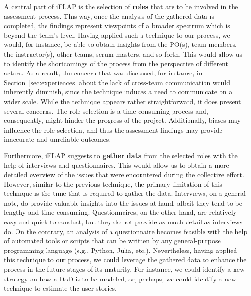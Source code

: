 \documentclass[conference]{IEEEtran}
\begin{document}
A central part of iFLAP is the selection of \textbf{roles} that are to be
involved in the assessment process. This way, once the analysis of the gathered
data is completed, the findings represent viewpoints of a broader spectrum
which is beyond the team's level. Having applied such a technique to our
process, we would, for instance, be able to obtain insights from the PO(s),
team members, the instructor(s), other teams, scrum masters, and so forth. This
would allow us to identify the shortcomings of the process from the perspective
of different actors. As a result, the concern that was discussed, for instance,
in Section~\ref{sec:experiences} about the lack of cross-team communication
would inherently diminish, since the technique induces a need to communicate on
a wider scale. While the technique appears rather straightforward, it does
present several concerns. The role selection is a time-consuming process and,
consequently, might hinder the progress of the project. Additionally, biases
may influence the role selection, and thus the assessment findings may provide
inaccurate and unreliable outcomes.

Furthermore, iFLAP suggests to \textbf{gather data} from the selected roles
with the help of interviews and questionnaires. This would allow us to obtain
a more detailed overview of the issues that were encountered during the collective
effort. However, similar to the previous technique, the primary limitation of
this technique is the time that is required to gather the data. Interviews, on
a general note, do provide valuable insights into the issues at hand, albeit
they tend to be lengthy and time-consuming. Questionnaires, on the other hand,
are relatively easy and quick to conduct, but they do not provide as much
detail as interviews do. On the contrary, an analysis of a questionnaire
becomes feasible with the help of automated tools or scripts that can be
written by any general-purpose programming language (e.g., Python, Julia,
etc.). Nevertheless, having applied this technique to our process, we could
leverage the gathered data to enhance the process in the future stages of its
maturity. For instance, we could identify a new strategy on how a DoD is to be
modeled, or, perhaps, we could identify a new technique to estimate the user
stories.
\end{document}
